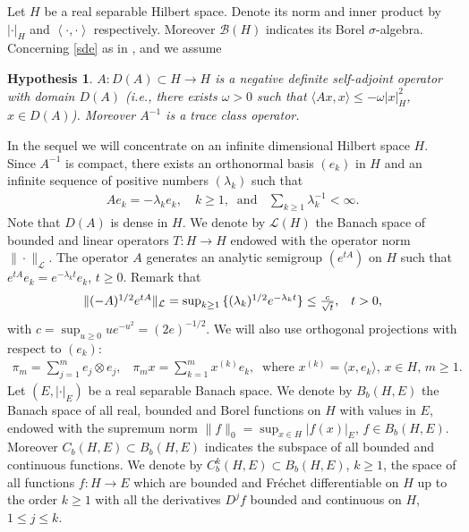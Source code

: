 \documentclass[preprint]{imsart}
\newtheorem{hypothesis}{Hypothesis}
\begin{document}
Let $H$ be a   real separable Hilbert space.  Denote its
norm and inner product  by $\left\vert \cdot \right\vert_H $
 and 
$\left\langle \cdot , \cdot \right\rangle $ respectively. Moreover  ${\mathcal B}(H)$ indicates its Borel $\sigma$-algebra.  
 Concerning \eqref{sde} 
 as in \cite{D2}, \cite{DFPR} and  \cite{DFRV} 
 we  assume  
\begin{hypothesis} \label{d1} 
 $A:D(A)\subset H\to H$ is a negative definite
self-adjoint operator with domain $D(A)$ (i.e., there exists $\omega >0$ such that  $\langle Ax, x\rangle \le - \omega |x|^2_H$, $x \in D(A)$). Moreover
 $A^{-1}$ 
 is a trace class operator.
 \end{hypothesis} 
 In the sequel we will concentrate on an infinite dimensional Hilbert space  $H.$ 
 Since $A^{-1}$ is compact, there exists an orthonormal basis $(e_k)$
in $H$ and an infinite sequence of positive numbers $(\lambda_k)$ such that
 \begin{equation} \label{e1a}
 \begin{array}{l}
  Ae_k=-\lambda_k e_k,\quad k\ge 1,\;\; \text{and } \;\; \sum_{k \ge 1} {\lambda_k^{-1}} < \infty.
\end{array}
\end{equation} 
  Note that $D(A)$ is dense in $H$.
We denote by  ${\mathcal L}(H)$  the Banach space of  bounded and linear operators $T: H \to H$ endowed with the operator norm $\| \cdot \|_{\mathcal  L}.$  
  The operator $A$ generates an analytic semigroup $(e^{tA})$ on $H$
such that $e^{tA} e_k = e^{- \lambda_k t } e_k$, $t \ge 0$.  
 Remark that  
\begin{equation} \label{ewd}
\begin{array}{l}
 \|  (-A)^{1/2} e^{tA} \|_{\cal L} = \sup_{k \ge 1}\, \{  (\lambda_k)^{1/2} e^{-\lambda_k t} \} \le \frac{c}{ \sqrt{t}},\;\;\; t>0,
\end{array}   
 \end{equation}
with  $c= \sup_{u \ge 0} u e^{-u^2}= (2e)^{-1/2}$.  We will also use orthogonal projections with respect to $(e_k)$:
\begin{equation} \label{pp1}
 \begin{array} {l}
\pi_m=\sum_{j=1}^me_j\otimes e_j, \;\;\; 
\pi_m x = \sum_{k=1}^m x^{(k)} e_k, \;\; \text{where $x^{(k)} = \langle x, e_k\rangle $, $x \in H$, $m \ge 1$. }      
 \end{array}
\end{equation} 
   Let $(E, |\cdot |_E)$ be a real separable Banach space. We denote by 
${B}_b(H, E)$
  the Banach space of all real, bounded and Borel functions on
  $H$ with values in $E$, endowed with the supremum norm $\| f \|_0 = \sup_{x \in H} |f(x)|_E$, $f \in {B}_b(H, E).$ Moreover 
  $C_b(H, E) \subset  B_b(H, E)  $ indicates the subspace of all   bounded and continuous  functions.
 We denote by $C^{k}_b (H,E) \subset {B}_b(H, E)$, $k \ge
1$, the  space of all functions $f: H \to E$ which are bounded
and Fr\'echet differentiable on $H$ up to the order $k \ge 1$ with
all the derivatives $D^j f$ bounded and continuous on $H$, $1 \le j \le k$. 
\end{document}
